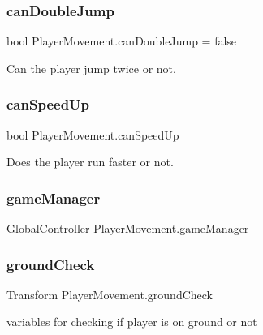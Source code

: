 \subsubsection{\texorpdfstring{can\+Double\+Jump}{canDoubleJump}}
{\footnotesize\ttfamily bool Player\+Movement.\+can\+Double\+Jump = false}



Can the player jump twice or not. 

\mbox{\label{class_player_movement_acddd245968579989670e4c0953ae2746}} 
\subsubsection{\texorpdfstring{can\+Speed\+Up}{canSpeedUp}}
{\footnotesize\ttfamily bool Player\+Movement.\+can\+Speed\+Up}



Does the player run faster or not. 

\mbox{\label{class_player_movement_adb2c84510e5bf27967dcff5bdfdf80d4}} 
\subsubsection{\texorpdfstring{game\+Manager}{gameManager}}
{\footnotesize\ttfamily \hyperlink{class_global_controller}{Global\+Controller} Player\+Movement.\+game\+Manager}

\mbox{\label{class_player_movement_a4c733d8e1fcc9ffd7223ac3182b380f5}} 
\subsubsection{\texorpdfstring{ground\+Check}{groundCheck}}
{\footnotesize\ttfamily Transform Player\+Movement.\+ground\+Check}



variables for checking if player is on ground or not 

